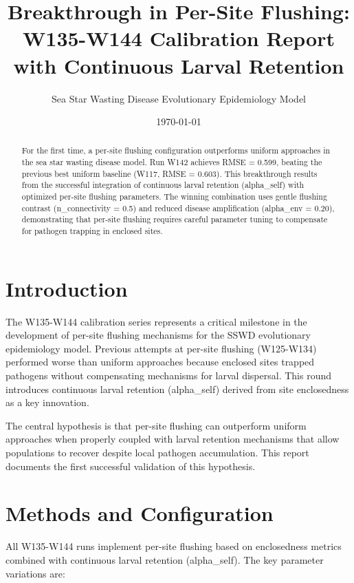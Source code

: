 \documentclass[11pt,letterpaper]{article}
\title{\textbf{Breakthrough in Per-Site Flushing: \\
W135-W144 Calibration Report with Continuous Larval Retention}}
\author{Sea Star Wasting Disease Evolutionary Epidemiology Model}
\date{\today}
\begin{document}
\maketitle

\begin{abstract}
For the first time, a per-site flushing configuration outperforms uniform approaches in the sea star wasting disease model. Run W142 achieves RMSE = 0.599, beating the previous best uniform baseline (W117, RMSE = 0.603). This breakthrough results from the successful integration of continuous larval retention (alpha\_self) with optimized per-site flushing parameters. The winning combination uses gentle flushing contrast (n\_connectivity = 0.5) and reduced disease amplification (alpha\_env = 0.20), demonstrating that per-site flushing requires careful parameter tuning to compensate for pathogen trapping in enclosed sites.
\end{abstract}

\section{Introduction}

The W135-W144 calibration series represents a critical milestone in the development of per-site flushing mechanisms for the SSWD evolutionary epidemiology model. Previous attempts at per-site flushing (W125-W134) performed worse than uniform approaches because enclosed sites trapped pathogens without compensating mechanisms for larval dispersal. This round introduces continuous larval retention (alpha\_self) derived from site enclosedness as a key innovation.

The central hypothesis is that per-site flushing can outperform uniform approaches when properly coupled with larval retention mechanisms that allow populations to recover despite local pathogen accumulation. This report documents the first successful validation of this hypothesis.

\section{Methods and Configuration}

All W135-W144 runs implement per-site flushing based on enclosedness metrics combined with continuous larval retention (alpha\_self). The key parameter variations are:
\end{document}
